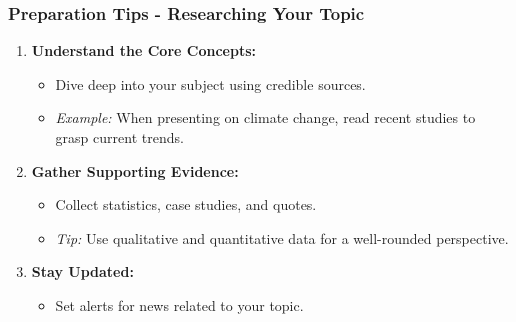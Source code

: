 \documentclass[aspectratio=169]{beamer}
\begin{document}
\begin{frame}[fragile]
    \frametitle{Preparation Tips - Researching Your Topic}
    \begin{enumerate}
        \item \textbf{Understand the Core Concepts:}
            \begin{itemize}
                \item Dive deep into your subject using credible sources.
                \item \textit{Example:} When presenting on climate change, read recent studies to grasp current trends.
            \end{itemize}
        
        \item \textbf{Gather Supporting Evidence:}
            \begin{itemize}
                \item Collect statistics, case studies, and quotes.
                \item \textit{Tip:} Use qualitative and quantitative data for a well-rounded perspective.
            \end{itemize}

        \item \textbf{Stay Updated:}
            \begin{itemize}
                \item Set alerts for news related to your topic.
            \end{itemize}
    \end{enumerate}
\end{frame}
\end{document}
